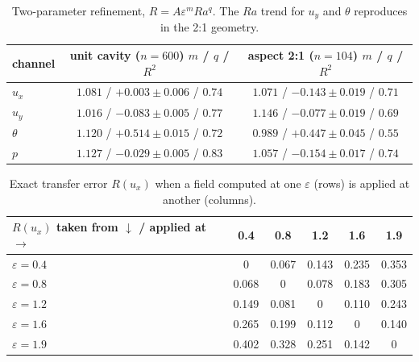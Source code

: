 \documentclass[preprint,11pt,a4paper,times]{elsarticle}
\begin{document}
\begin{table}[htbp]
\centering
\small
\caption{Two-parameter refinement, $R=A\varepsilon^mRa^q$. The $Ra$ trend for $u_y$ and $\theta$
reproduces in the 2:1 geometry.}
\label{tab:two-param}
\begin{tabular}{@{}lcc@{}}
\toprule
channel & unit cavity ($n=600$) $m$ / $q$ / $R^2$ & aspect 2:1 ($n=104$) $m$ / $q$ / $R^2$\\
\midrule
$u_x$ & $1.081$ / $+0.003\pm0.006$ / $0.74$ & $1.071$ / $-0.143\pm0.019$ / $0.71$\\
$u_y$ & $1.016$ / $-0.083\pm0.005$ / $0.77$ & $1.146$ / $-0.077\pm0.019$ / $0.69$\\
$\theta$ & $1.120$ / $+0.514\pm0.015$ / $0.72$ & $0.989$ / $+0.447\pm0.045$ / $0.55$\\
$p$ & $1.127$ / $-0.029\pm0.005$ / $0.83$ & $1.057$ / $-0.154\pm0.017$ / $0.74$\\
\bottomrule
\end{tabular}
\end{table}

\begin{table}[htbp]
\centering
\small
\caption{Exact transfer error $R(u_x)$ when a field computed at one $\varepsilon$ (rows) is
applied at another (columns).}
\label{tab:transfer-matrix}
\begin{tabular}{@{}lccccc@{}}
\toprule
$R(u_x)$ taken from $\downarrow$ / applied at $\to$ & 0.4 & 0.8 & 1.2 & 1.6 & 1.9\\
\midrule
$\varepsilon=0.4$ & 0 & 0.067 & 0.143 & 0.235 & 0.353\\
$\varepsilon=0.8$ & 0.068 & 0 & 0.078 & 0.183 & 0.305\\
$\varepsilon=1.2$ & 0.149 & 0.081 & 0 & 0.110 & 0.243\\
$\varepsilon=1.6$ & 0.265 & 0.199 & 0.112 & 0 & 0.140\\
$\varepsilon=1.9$ & 0.402 & 0.328 & 0.251 & 0.142 & 0\\
\bottomrule
\end{tabular}
\end{table}
\end{document}
